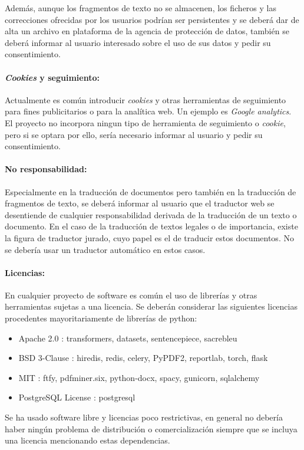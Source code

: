 Además, aunque los fragmentos de texto no se almacenen, los ficheros y las correcciones ofrecidas por los usuarios podrían ser persistentes y se deberá dar de alta un archivo en plataforma de la agencia de protección de datos, también se deberá informar al usuario interesado sobre el uso de sus datos y pedir su consentimiento.

\paragraph{\textit{Cookies} y seguimiento:}
Actualmente es común introducir \textit{cookies} y otras herramientas de seguimiento para fines publicitarios o para la analítica web. Un ejemplo es \textit{Google analytics}. El proyecto no incorpora ningun tipo de herramienta de seguimiento o \textit{cookie}, pero si se optara por ello, sería necesario informar al usuario y pedir su consentimiento.

\paragraph{No responsabilidad:}
Especialmente en la traducción de documentos pero también en la traducción de fragmentos de texto, se deberá informar al usuario que el traductor web se desentiende de cualquier responsabilidad derivada de la traducción de un texto o documento. En el caso de la traducción de textos legales o de importancia, existe la figura de traductor jurado, cuyo papel es el de traducir estos documentos. No se debería usar un traductor automático en estos casos.

\paragraph{Licencias:}
En cualquier proyecto de software es común el uso de librerías y otras herramientas sujetas a una licencia. Se deberán considerar las siguientes licencias procedentes mayoritariamente de librerías de python:
\begin{itemize}
    \item Apache 2.0 \cite{Apache2license}: transformers, datasets, sentencepiece, sacrebleu
    \item BSD 3-Clause \cite{BSD3Clause}: hiredis, redis, celery, PyPDF2, reportlab, torch, flask
    \item MIT \cite{MITLicense}: ftfy, pdfminer.six, python-docx, spacy, gunicorn, sqlalchemy
    \item PostgreSQL License \cite{Postgreslicense}: postgresql
\end{itemize}
Se ha usado software libre y licencias poco restrictivas, en general no debería haber ningún problema de distribución o comercialización siempre que se incluya una licencia mencionando estas dependencias.


